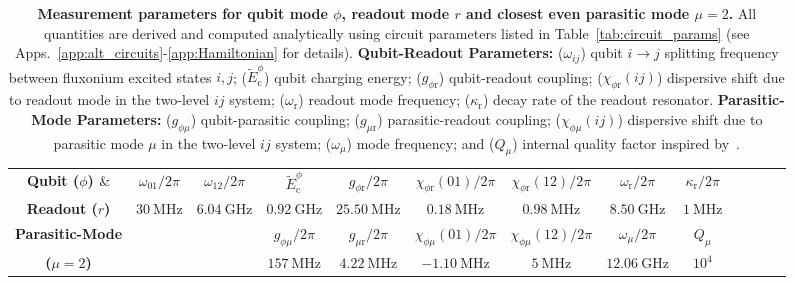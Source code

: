 \documentclass[%
reprint,
superscriptaddress,
 amsmath,amssymb,
 aps,
 prx,
longbibliography,
floatfix,
]{revtex4-2}
\begin{document}
\begin{table}[tb]
    \centering
\begin{tabular}{|c|c|c|c|c|c|c|c|c|c|c|c|c|}
    \hline
    \textbf{Qubit ($\phi$) $\&$}&$\omega_{01}/2\pi$&$\omega_{12}/2\pi$ &$\tilde{E}^\phi_\textrm{c}$ &$g_{\phi \textrm{r}}/2\pi$&$\chi_{\phi \textrm{r}}(01)/2\pi$&$\chi_{\phi \textrm{r}}(12)/2\pi$&$\omega_\textrm{r}/2\pi$&$\kappa_\textrm{r}/2\pi$\\
    \cline{2-9}
\textbf{Readout ($r$)}&$30 \ \mathrm{MHz}$& $6.04 \ \mathrm{GHz}$ & $0.92 \ \mathrm{GHz}$& $25.50 \ \mathrm{MHz}$& $0.18 \ \mathrm{MHz}$&$0.98 \ \mathrm{MHz}$&$8.50 \ \mathrm{GHz}$&$1 \ \mathrm{MHz}$\\    
\hline\textbf{Parasitic-Mode} & \multicolumn{2}{c|}{} & $g_{\phi\mu}/2\pi$&$g_{\mu \textrm{r}}/2\pi$&$\chi_{\phi\mu}(01)/2\pi$&$\chi_{\phi\mu}(12)/2\pi$&$\omega_\mu/2\pi$&$Q_\mu$\\
    \cline{4-9}
\textbf{($\mu=2$)}&\multicolumn{2}{c|}{} &$157 \ \mathrm{MHz}$& $4.22 \ \mathrm{MHz}$& $-1.10 \ \mathrm{MHz}$& $5 \ \mathrm{MHz}$& $12.06 \ \mathrm{GHz}$&$10^{4}$\\    
\hline
\end{tabular}
\caption{{\bf Measurement parameters for qubit mode $\phi$, readout mode $r$ and closest even parasitic mode $\mu=2$.}  All quantities are derived and computed analytically using circuit parameters listed in Table~\ref{tab:circuit_params} (see Apps.~\ref{app:alt_circuits}-\ref{app:Hamiltonian} for details). \textbf{Qubit-Readout Parameters:} ($\omega_{ij}$) qubit $i\rightarrow j$ splitting frequency between fluxonium excited states $i, j$; ($\tilde{E}^\phi_\textrm{c}$) qubit charging energy; ($g_{\phi \textrm{r}}$) qubit-readout coupling; ($\chi_{\phi \textrm{r}}(ij)$) dispersive shift due to readout mode in the two-level $ij$ system; ($\omega_\textrm{r}$) readout mode frequency; ($\kappa_\textrm{r}$) decay rate of the readout resonator. \textbf{Parasitic-Mode Parameters:} ($g_{\phi \mu}$) qubit-parasitic coupling; ($g_{\mu \textrm{r}}$) parasitic-readout coupling; ($\chi_{\phi \mu}(ij)$) dispersive shift due to parasitic mode $\mu$ in the two-level $ij$ system; ($\omega_\mu$) mode frequency; and ($Q_\mu$) internal quality factor inspired by~\cite{masluk_microwave_2012}.}   \label{tab:readout_params}
\end{table}



\end{document}
